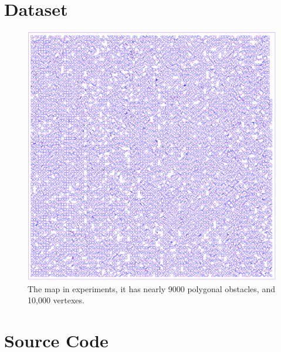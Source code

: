\appendix
\chapter{Dataset}
\begin{figure}[htb]
  \centering
  \includegraphics[width=\linewidth]{./pic/poly9000.png}
  \caption{\small The map in experiments, it has nearly 9000 polygonal obstacles, and 10,000
  vertexes.}
\end{figure}
\chapter{Source Code}

\newpage

\newpage

\newpage

\newpage
